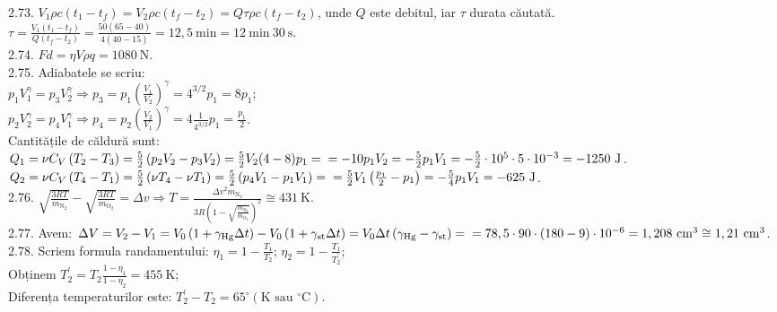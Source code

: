 2.73. $V_{1} \rho c\left(t_{1}-t_{f}\right)=V_{2} \rho c\left(t_{f}-t_{2}\right)=Q \tau \rho c\left(t_{f}-t_{2}\right)$, unde $Q$ este debitul, iar $\tau$ durata căutată.\\ $\tau=\frac{V_{1}\left(t_{1}-t_{f}\right)}{Q\left(t_{f}-t_{2}\right)}=\frac{50(65-40)}{4(40-15)}=12,5 \mathrm{~min}=12 \mathrm{~min}\ 30 \mathrm{~s}$.\\

2.74. $F d=\eta V \rho q=1080 \mathrm{~N}$.\\

2.75. Adiabatele se scriu:\\ $p_{1} V_{1}^{\gamma}=p_{3} V_{2}^{\gamma} \Rightarrow p_{3}=p_{1}\left(\frac{V_{1}}{V_{2}}\right)^{\gamma}=4^{3 / 2} p_{1}=8 p_{1}$;\\ $p_{2} V_{2}^{\gamma}=p_{4} V_{1}^{\gamma} \Rightarrow p_{4}=p_{2}\left(\frac{V_{2}}{V_{1}}\right)^{\gamma}=4 \frac{1}{4^{3 / 2}} p_{1}=\frac{p_{1}}{2}$.\\ Cantitățile de căldură sunt:\\ $Q_{1}=\nu C_{V}\left(T_{2}-T_{3}\right)=\frac{5}{2}\left(p_{2} V_{2}-p_{3} V_{2}\right)=\frac{5}{2} V_{2}(4-8) p_{1}= \\ =-10 p_{1} V_{2}=-\frac{5}{2} p_{1} V_{1}=-\frac{5}{2} \cdot 10^{5} \cdot 5 \cdot 10^{-3}=-1250 \mathrm{~J}$.\\ $Q_{2}=\nu C_{V}\left(T_{4}-T_{1}\right)=\frac{5}{2}\left(\nu T_{4}-\nu T_{1}\right)=\frac{5}{2}\left(p_{4} V_{1}-p_{1} V_{1}\right)= \\ =\frac{5}{2} V_{1}\left(\frac{p_{1}}{2}-p_{1}\right)=-\frac{5}{4} p_{1} V_{1}=-625 \mathrm{~J}$.\\

2.76. $\sqrt{\frac{3 R T}{m_{\mathrm{N}_{2}}}}-\sqrt{\frac{3 R T}{m_{\mathrm{O}_{2}}}}=\Delta v \Rightarrow T=\frac{\Delta v^{2} m_{\mathrm{N}_{2}}}{3 R\left(1-\sqrt{\frac{m_{\mathrm{N}_{2}}}{m_{\mathrm{O}_{2}}}}\right)^{2}} \cong 431 \mathrm{~K}$.\\

2.77. Avem: $\Delta V=V_{2}-V_{1}=V_{0}\left(1+\gamma_{\mathrm{Hg}} \Delta t\right)-V_{0}\left(1+\gamma_{\mathrm{st}} \Delta t\right)=V_{0} \Delta t\left(\gamma_{\mathrm{Hg}}-\gamma_{\mathrm{st}}\right)= \\ =78,5 \cdot 90 \cdot(180-9) \cdot 10^{-6}=1,208 \mathrm{~cm}^{3} \cong 1,21 \mathrm{~cm}^{3}$.\\

2.78. Scriem formula randamentului: $\eta_{1}=1-\frac{T_{1}}{T_{2}}$; \quad $\eta_{2}=1-\frac{T_{1}}{T_{2}^{\prime}}$;\\ Obținem $T_{2}^{\prime}=T_{2} \frac{1-\eta_{1}}{1-\eta_{2}}=455 \mathrm{~K}$;\\ Diferența temperaturilor este: $T_{2}^{\prime}-T_{2}=65^{\circ}\left(\mathrm{K} \text { sau }{ }^{\circ} \mathrm{C}\right).$\\

